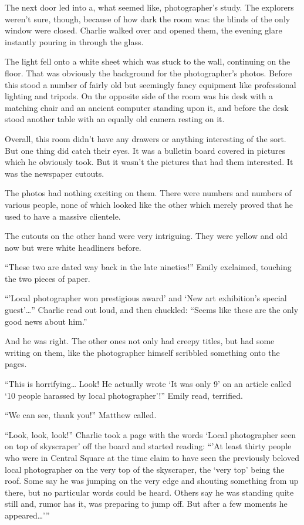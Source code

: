 The next door led into a, what seemed like, photographer’s study. The explorers weren’t sure, though, because of how dark the room was: the blinds of the only window were closed. Charlie walked over and opened them, the evening glare instantly pouring in through the glass.

The light fell onto a white sheet which was stuck to the wall, continuing on the floor. That was obviously the background for the photographer’s photos. Before this stood a number of fairly old but seemingly fancy equipment like professional lighting and tripods. On the opposite side of the room was his desk with a matching chair and an ancient computer standing upon it, and before the desk stood another table with an equally old camera resting on it.

Overall, this room didn’t have any drawers or anything interesting of the sort. But one thing did catch their eyes. It was a bulletin board covered in pictures which he obviously took. But it wasn’t the pictures that had them interested. It was the newspaper cutouts.

The photos had nothing exciting on them. There were numbers and numbers of various people, none of which looked like the other which merely proved that he used to have a massive clientele.

The cutouts on the other hand were very intriguing. They were yellow and old now but were white headliners before.

“These two are dated way back in the late nineties!” Emily exclaimed, touching the two pieces of paper.

“’Local photographer won prestigious award’ and ‘New art exhibition’s special guest’…” Charlie read out loud, and then chuckled: “Seems like these are the only good news about him.”

And he was right. The other ones not only had creepy titles, but had some writing on them, like the photographer himself scribbled something onto the pages.

“This is horrifying… Look! He actually wrote ‘It was only 9’ on an article called ‘10 people harassed by local photographer’!” Emily read, terrified.

“We can see, thank you!” Matthew called.

“Look, look, look!” Charlie took a page with the words ‘Local photographer seen on top of skyscraper’ off the board and started reading: “’At least thirty people who were in Central Square at the time claim to have seen the previously beloved local photographer on the very top of the skyscraper, the ‘very top’ being the roof. Some say he was jumping on the very edge and shouting something from up there, but no particular words could be heard. Others say he was standing quite still and, rumor has it, was preparing to jump off. But after a few moments he appeared…’”

